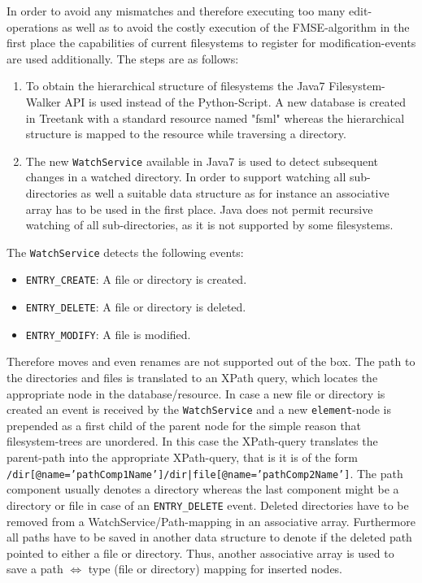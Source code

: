In order to avoid any mismatches and therefore executing too many edit-operations as well as to avoid the costly execution of the FMSE-algorithm in the first place the capabilities of current filesystems to register for modification-events are used additionally. The steps are as follows:

\begin{enumerate}
\item To obtain the hierarchical structure of filesystems the Java7 Filesystem-Walker API is used instead of the Python-Script. A new database is created in Treetank with a standard resource named "fsml" whereas the hierarchical structure is mapped to the resource while traversing a directory. 
\item The new \texttt{WatchService} available in Java7 is used to detect subsequent changes in a watched directory. In order to support watching all sub-directories as well a suitable data structure as for instance an associative array has to be used in the first place. Java does not permit recursive watching of all sub-directories, as it is not supported by some filesystems.
\end{enumerate}

The \texttt{WatchService} detects the following events:

\begin{itemize}
\item \texttt{ENTRY\_CREATE}: A file or directory is created.
\item \texttt{ENTRY\_DELETE}: A file or directory is deleted.
\item \texttt{ENTRY\_MODIFY}: A file is modified.
\end{itemize}

Therefore moves and even renames are not supported out of the box. The path to the directories and files is translated to an XPath query, which locates the appropriate node in the database/resource. In case a new file or directory is created an event is received by the \texttt{WatchService} and a new \texttt{element}-node is pre\-pen\-ded as a first child of the parent node for the simple reason that filesystem-trees are unordered. In this case the XPath-query translates the parent-path into the appropriate XPath-query, that is it is of the form \\\texttt{/dir[@name='pathComp1Name']/dir|file[@name='pathComp2Name']}. The path component usually denotes a directory whereas the last component might be a directory or file in case of an \texttt{ENTRY\_DELETE} event. Deleted directories have to be removed from a WatchService/Path-mapping in an associative array. Furthermore all paths have to be saved in another data structure to denote if the deleted path pointed to either a file or directory. Thus, another associative array is used to save a path $\Leftrightarrow$ type (file or directory) mapping for inserted nodes.

